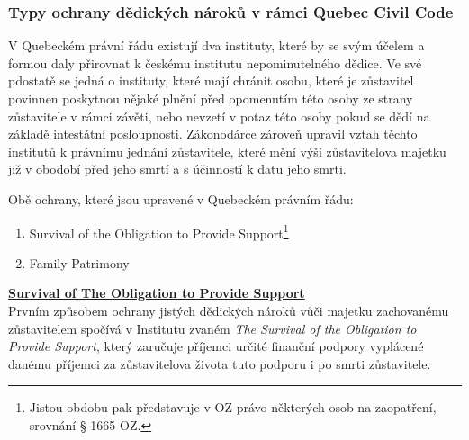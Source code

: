 \documentclass{article}
\begin{document}



\subsubsection{Typy ochrany dědických nároků v rámci Quebec Civil Code}

V Quebeckém právní řádu existují dva instituty, které by se svým účelem a formou daly přirovnat k českému institutu nepominutelného dědice. Ve své pdostatě se jedná o instituty, které mají chránit osobu, které je zůstavitel povinnen poskytnou nějaké plnění před opomenutím této osoby ze strany zůstavitele v rámci závěti, nebo nevzetí v potaz této osoby pokud se dědí na základě intestátní posloupnosti. Zákonodárce zároveň upravil vztah těchto institutů k právnímu jednání zůstavitele, které mění výši zůstavitelova majetku již v obodobí před jeho smrtí a s účinností k datu jeho smrti. \\

\vspace{5 mm}

Obě ochrany, které jsou upravené v Quebeckém právním řádu:

\begin{enumerate}
\item Survival of the Obligation to Provide Support\footnote{Jistou obdobu pak představuje v OZ právo některých osob na zaopatření, srovnání § 1665 OZ.}
\item Family Patrimony	
\end{enumerate}


\vspace{5 mm}

\underline{\textbf{Survival of The Obligation to Provide Support}}\\

Prvním způsobem ochrany jistých dědických nároků vůči majetku zachované\-mu zůstavitelem spočívá v Institutu zvaném \textit{The Survival of the Obligation to Provide Support}, který zaručuje příjemci určité finanční podpory vyplácené danému příjemci za zůstavitelova života tuto podporu i po smrti zůstavitele. \\
\end{document}
